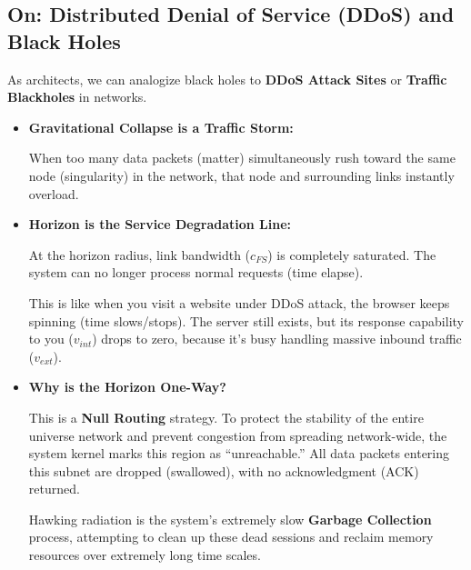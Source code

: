\subsection{On: Distributed Denial of Service (DDoS) and Black Holes}

As architects, we can analogize black holes to \textbf{DDoS Attack Sites} or \textbf{Traffic Blackholes} in networks.

\begin{itemize}
\item \textbf{Gravitational Collapse is a Traffic Storm:}

    When too many data packets (matter) simultaneously rush toward the same node (singularity) in the network, that node and surrounding links instantly overload.

\item \textbf{Horizon is the Service Degradation Line:}

    At the horizon radius, link bandwidth (\textbf{$c_{FS}$}) is completely saturated. The system can no longer process normal requests (time elapse).

    This is like when you visit a website under DDoS attack, the browser keeps spinning (time slows/stops). The server still exists, but its response capability to you (\textbf{$v_{int}$}) drops to zero, because it's busy handling massive inbound traffic (\textbf{$v_{ext}$}).

\item \textbf{Why is the Horizon One-Way?}

    This is a \textbf{Null Routing} strategy. To protect the stability of the entire universe network and prevent congestion from spreading network-wide, the system kernel marks this region as ``unreachable.'' All data packets entering this subnet are dropped (swallowed), with no acknowledgment (ACK) returned.

    Hawking radiation is the system's extremely slow \textbf{Garbage Collection} process, attempting to clean up these dead sessions and reclaim memory resources over extremely long time scales.
\end{itemize}


